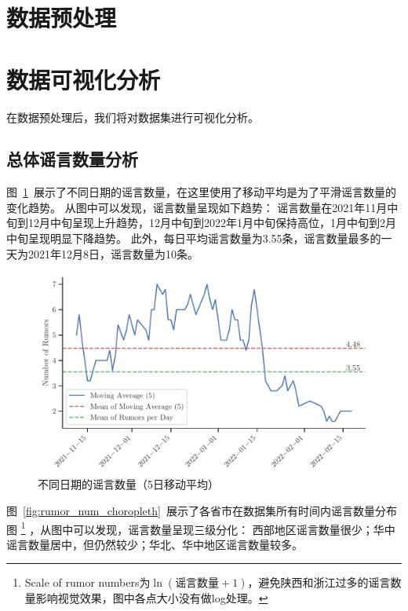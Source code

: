 \documentclass[UTF8]{ctexart}
\begin{document}
\clearpage
\makecover

\pagebreak

\tableofcontents

\pagebreak

\section{数据预处理}


\section{数据可视化分析}

在数据预处理后，我们将对数据集进行可视化分析。

\subsection{总体谣言数量分析}


图~\ref{fig:rumor_num_ma5}~展示了不同日期的谣言数量，在这里使用了移动平均是为了平滑谣言数量的变化趋势。
从图中可以发现，谣言数量呈现如下趋势：
谣言数量在2021年11月中旬到12月中旬呈现上升趋势，12月中旬到2022年1月中旬保持高位，1月中旬到2月中旬呈现明显下降趋势。
此外，每日平均谣言数量为3.55条，谣言数量最多的一天为2021年12月8日，谣言数量为10条。

\begin{figure}[!ht]
    \includegraphics[width=\linewidth]{../figures/rumor_num_ma5}
    \caption{不同日期的谣言数量（5日移动平均）}
    \label{fig:rumor_num_ma5}
\end{figure}


图~\ref{fig:rumor_num_choropleth}~展示了各省市在数据集所有时间内谣言数量分布图
\footnote{Scale of rumor numbers为$\ln(\textrm{谣言数量} + 1)$，避免陕西和浙江过多的谣言数量影响视觉效果，图中各点大小没有做log处理。}
，从图中可以发现，谣言数量呈现三级分化：
西部地区谣言数量很少；华中谣言数量居中，但仍然较少；华北、华中地区谣言数量较多。
\end{document}
